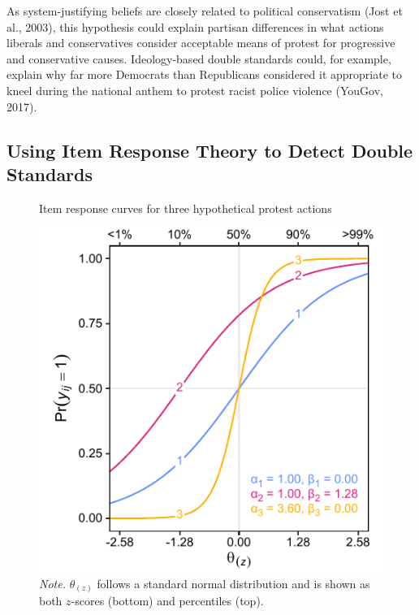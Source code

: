\documentclass[twocolumn, 11pt, letterpaper]{article}
\begin{document}
As system-justifying beliefs are closely related to political
conservatism (Jost et al., 2003), this hypothesis could explain partisan
differences in what actions liberals and conservatives consider
acceptable means of protest for progressive and conservative causes.
Ideology-based double standards could, for example, explain why far more
Democrats than Republicans considered it appropriate to kneel during the
national anthem to protest racist police violence (YouGov, 2017).

\hypertarget{using-item-response-theory-to-detect-double-standards}{%
\subsection{Using Item Response Theory to Detect Double
Standards}\label{using-item-response-theory-to-detect-double-standards}}

\begin{figure}
\centering
\caption{Item response curves for three hypothetical protest actions}
\includegraphics[scale=1]{../Scale Development/figures/figure-1}
\caption*{\textit{Note.} $\theta_{(z)}$ follows a standard normal distribution and is shown as both $z$-scores (bottom) and percentiles (top).}
\label{fig:f1}
\end{figure}
\end{document}
